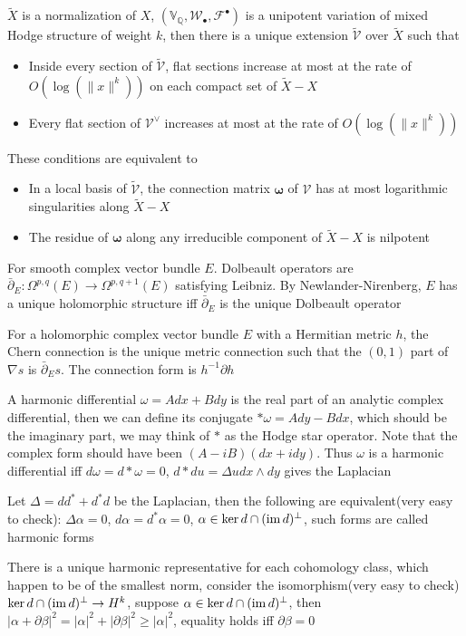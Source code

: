 \documentclass[main]{subfiles}
\begin{document}
\begin{theorem}[Deligne]\label{Deligne's theorem on unipotent VMHS}
$\tilde X$ is a normalization of $X$, $(\mathbb V_{\mathbb Q},\mathcal W_\bullet,\mathcal F^\bullet)$ is a unipotent variation of mixed Hodge structure of weight $k$, then there is a unique extension $\mathcal{\tilde V}$ over $\tilde X$ such that
\begin{itemize}
\item Inside every section of $\mathcal{\tilde V}$, flat sections increase at most at the rate of $O(\log(\|x\|^k))$ on each compact set of $\tilde X-X$
\item Every flat section of $\mathcal V^\vee$ increases at most at the rate of $O(\log(\|x\|^k))$
\end{itemize}
These conditions are equivalent to
\begin{itemize}
\item In a local basis of $\mathcal{\tilde V}$, the connection matrix $\bm\omega$ of $\mathcal V$ has at most logarithmic singularities along $\tilde X-X$
\item The residue of $\bm\omega$ along any irreducible component of $\tilde X-X$ is nilpotent
\end{itemize}
\end{theorem}

For smooth complex vector bundle $E$. Dolbeault operators are $\bar\partial_E:\Omega^{p,q}(E)\to\Omega^{p,q+1}(E)$ satisfying Leibniz. By Newlander-Nirenberg, $E$ has a unique holomorphic structure iff $\bar\partial_E$ is the unique Dolbeault operator

For a holomorphic complex vector bundle $E$ with a Hermitian metric $h$, the Chern connection is the unique metric connection such that the $(0,1)$ part of $\nabla s$ is $\bar\partial_Es$. The connection form is $h^{-1}\partial h$

\begin{definition}
A harmonic differential $\omega=Adx+Bdy$ is the real part of an analytic complex differential, then we can define its conjugate $*\omega=Ady-Bdx$, which should be the imaginary part, we may think of $*$ as the Hodge star operator. Note that the complex form should have been $(A-iB)(dx+idy)$. Thus $\omega$ is a harmonic differential iff $d\omega=d*\omega=0$, $d*du=\Delta udx\wedge dy$ gives the Laplacian
\end{definition}

Let $\Delta=dd^*+d^*d$ be the Laplacian, then the following are equivalent(very easy to check): $\Delta\alpha=0$, $d\alpha=d^*\alpha=0$, $\alpha\in\ker d\cap(\operatorname{im} d)^\perp$, such forms are called harmonic forms

There is a unique harmonic representative for each cohomology class, which happen to be of the smallest norm, consider the isomorphism(very easy to check) $\ker d\cap(\operatorname{im} d)^\perp\to H^k$, suppose $\alpha\in\ker d\cap(\operatorname{im} d)^\perp$, then $|\alpha+\partial\beta|^2=|\alpha|^2+|\partial\beta|^2\geq |\alpha|^2$, equality holds iff $\partial\beta=0$
\end{document}
